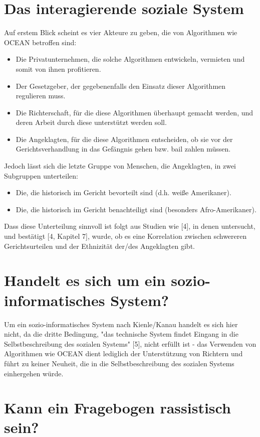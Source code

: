\documentclass[10pt, a4paper, twocolumn]{article} %
\begin{document}
\section{Das interagierende soziale System}
Auf erstem Blick scheint es vier Akteure zu geben, die von Algorithmen wie OCEAN betroffen sind:
\begin{itemize}
  \item Die Privatunternehmen, die solche Algorithmen entwickeln, vermieten und somit von ihnen profitieren.
  \item Der Gesetzgeber, der gegebenenfalls den Einsatz dieser Algorithmen regulieren muss.
  \item Die Richterschaft, für die diese Algorithmen überhaupt gemacht werden, und deren Arbeit durch diese unterstützt werden soll.
  \item Die Angeklagten, für die diese Algorithmen entscheiden, ob sie vor der Gerichtsverhandlung in das Gefängnis gehen bzw. bail zahlen müssen.
\end{itemize}
Jedoch lässt sich die letzte Gruppe von Menschen, die Angeklagten, in zwei Subgruppen unterteilen: 
\begin{itemize}
  \item Die, die historisch im Gericht bevorteilt sind (d.h. weiße Amerikaner).
  \item Die, die historisch im Gericht benachteiligt sind (besonders Afro-Amerikaner).
\end{itemize}
Dass diese Unterteilung sinnvoll ist folgt aus Studien wie [4], in denen untersucht, und bestätigt [4, Kapitel 7], wurde, ob es eine Korrelation zwischen schwereren Gerichtsurteilen und der Ethnizität der/des Angeklagten gibt.

\section{Handelt es sich um ein sozio-informatisches System?}
Um ein sozio-informatisches System nach Kienle/Kanau handelt es sich hier nicht, da die dritte Bedingung, "das technische System findet Eingang in die Selbstbeschreibung des sozialen Systems" [5], nicht erfüllt ist - das Verwenden von Algorithmen wie OCEAN dient lediglich der Unterstützung von Richtern und führt zu keiner Neuheit, die in die Selbstbeschreibung des sozialen Systems einhergehen würde.

\section{Kann ein Fragebogen rassistisch sein?}
\end{document}
